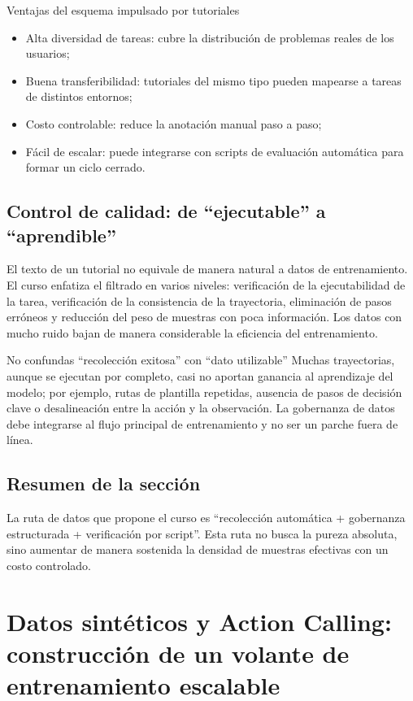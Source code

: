 \documentclass[a4paper]{article}
\begin{document}
\begin{knowledgebox}{Ventajas del esquema impulsado por tutoriales}
\begin{itemize}
    \item Alta diversidad de tareas: cubre la distribución de problemas reales de los usuarios;
    \item Buena transferibilidad: tutoriales del mismo tipo pueden mapearse a tareas de distintos entornos;
    \item Costo controlable: reduce la anotación manual paso a paso;
    \item Fácil de escalar: puede integrarse con scripts de evaluación automática para formar un ciclo cerrado.
\end{itemize}
\end{knowledgebox}

\subsection{Control de calidad: de ``ejecutable'' a ``aprendible''}
El texto de un tutorial no equivale de manera natural a datos de entrenamiento. El curso enfatiza el filtrado en varios niveles: verificación de la ejecutabilidad de la tarea, verificación de la consistencia de la trayectoria, eliminación de pasos erróneos y reducción del peso de muestras con poca información. Los datos con mucho ruido bajan de manera considerable la eficiencia del entrenamiento.

\begin{warningbox}{No confundas ``recolección exitosa'' con ``dato utilizable''}
Muchas trayectorias, aunque se ejecutan por completo, casi no aportan ganancia al aprendizaje del modelo; por ejemplo, rutas de plantilla repetidas, ausencia de pasos de decisión clave o desalineación entre la acción y la observación. La gobernanza de datos debe integrarse al flujo principal de entrenamiento y no ser un parche fuera de línea.
\end{warningbox}

\subsection{Resumen de la sección}
La ruta de datos que propone el curso es ``recolección automática + gobernanza estructurada + verificación por script''. Esta ruta no busca la pureza absoluta, sino aumentar de manera sostenida la densidad de muestras efectivas con un costo controlado.
\section{Datos sintéticos y Action Calling: construcción de un volante de entrenamiento escalable}
\end{document}
